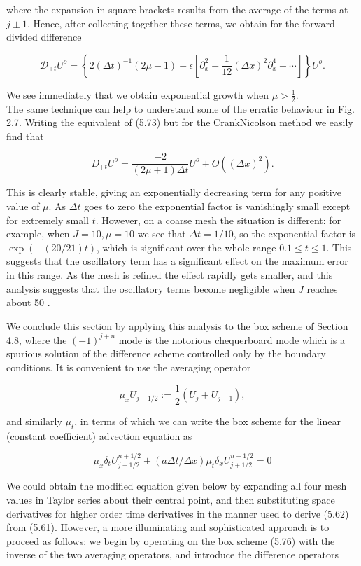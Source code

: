 \documentclass[10pt]{article}
\begin{document}
where the expansion in square brackets results from the average of the terms at \(j \pm 1\). Hence, after collecting together these terms, we obtain for the forward divided difference

\[
\mathcal{D}_{+t} U^{o}=\left\{2(\Delta t)^{-1}(2 \mu-1)+\epsilon\left[\partial_{x}^{2}+\frac{1}{12}(\Delta x)^{2} \partial_{x}^{4}+\cdots\right]\right\} U^{o} .
\]

We see immediately that we obtain exponential growth when \(\mu>\frac{1}{2}\).\\
The same technique can help to understand some of the erratic behaviour in Fig. 2.7. Writing the equivalent of (5.73) but for the CrankNicolson method we easily find that

\[
D_{+t} U^{o}=\frac{-2}{(2 \mu+1) \Delta t} U^{o}+O\left((\Delta x)^{2}\right) .
\]

This is clearly stable, giving an exponentially decreasing term for any positive value of \(\mu\). As \(\Delta t\) goes to zero the exponential factor is vanishingly small except for extremely small \(t\). However, on a coarse mesh the situation is different: for example, when \(J=10, \mu=10\) we see that \(\Delta t=1 / 10\), so the exponential factor is \(\exp (-(20 / 21) t)\), which is significant over the whole range \(0.1 \leq t \leq 1\). This suggests that the oscillatory term has a significant effect on the maximum error in this range. As the mesh is refined the effect rapidly gets smaller, and this analysis suggests that the oscillatory terms become negligible when \(J\) reaches about 50 .

We conclude this section by applying this analysis to the box scheme of Section 4.8, where the \((-1)^{j+n}\) mode is the notorious chequerboard mode which is a spurious solution of the difference scheme controlled only by the boundary conditions. It is convenient to use the averaging operator

\[
\mu_{x} U_{j+1 / 2}:=\frac{1}{2}\left(U_{j}+U_{j+1}\right),
\]

and similarly \(\mu_{t}\), in terms of which we can write the box scheme for the linear (constant coefficient) advection equation as

\[
\mu_{x} \delta_{t} U_{j+1 / 2}^{n+1 / 2}+(a \Delta t / \Delta x) \mu_{t} \delta_{x} U_{j+1 / 2}^{n+1 / 2}=0
\]

We could obtain the modified equation given below by expanding all four mesh values in Taylor series about their central point, and then substituting space derivatives for higher order time derivatives in the manner used to derive (5.62) from (5.61). However, a more illuminating and sophisticated approach is to proceed as follows: we begin by operating on the box scheme (5.76) with the inverse of the two averaging operators, and introduce the difference operators
\end{document}
